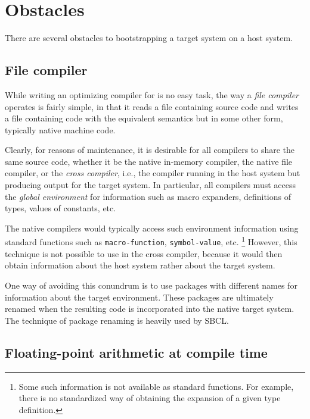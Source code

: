 \section{Obstacles}

There are several obstacles to bootstrapping a target \commonlisp{}
system on a host \commonlisp{} system.

\subsection{File compiler}

While writing an optimizing compiler for \commonlisp{} is no easy
task, the way a \emph{file compiler} operates is fairly simple, in
that it reads a file containing source code and writes a file
containing code with the equivalent semantics but in some other form,
typically native machine code.

Clearly, for reasons of maintenance, it is desirable for all compilers
to share the same source code, whether it be the native in-memory
compiler, the native file compiler, or the \emph{cross compiler},
i.e., the compiler running in the host \commonlisp{} system but
producing output for the target system.  In particular, all compilers
must access the \emph{global environment} for information such as
macro expanders, definitions of types, values of constants, etc.

The native compilers would typically access such environment
information using standard functions such as \texttt{macro-function},
\texttt{symbol-value}, etc.%
\footnote{Some such information is not available as standard
  functions.  For example, there is no standardized way of obtaining
  the expansion of a given type definition.}
However, this technique is not possible to use in the cross compiler,
because it would then obtain information about the host \commonlisp{}
system rather about the target \commonlisp{} system.

One way of avoiding this conundrum is to use packages with different
names for information about the target environment.  These packages
are ultimately renamed when the resulting code is incorporated into
the native target system.  The technique of package renaming is
heavily used by SBCL.

\subsection{Floating-point arithmetic at compile time}

